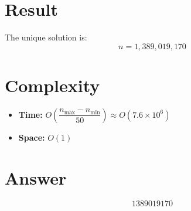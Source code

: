 \documentclass[12pt]{article}
\begin{document}
\section{Result}
The unique solution is:
\[
\boxed{n = 1{,}389{,}019{,}170}
\]

\section{Complexity}
\begin{itemize}
    \item \textbf{Time:} $O\!\left(\dfrac{n_{\max} - n_{\min}}{50}\right) \approx O(7.6 \times 10^6)$
    \item \textbf{Space:} $O(1)$
\end{itemize}

\section{Answer}

\[
\boxed{1389019170}
\]
\end{document}
